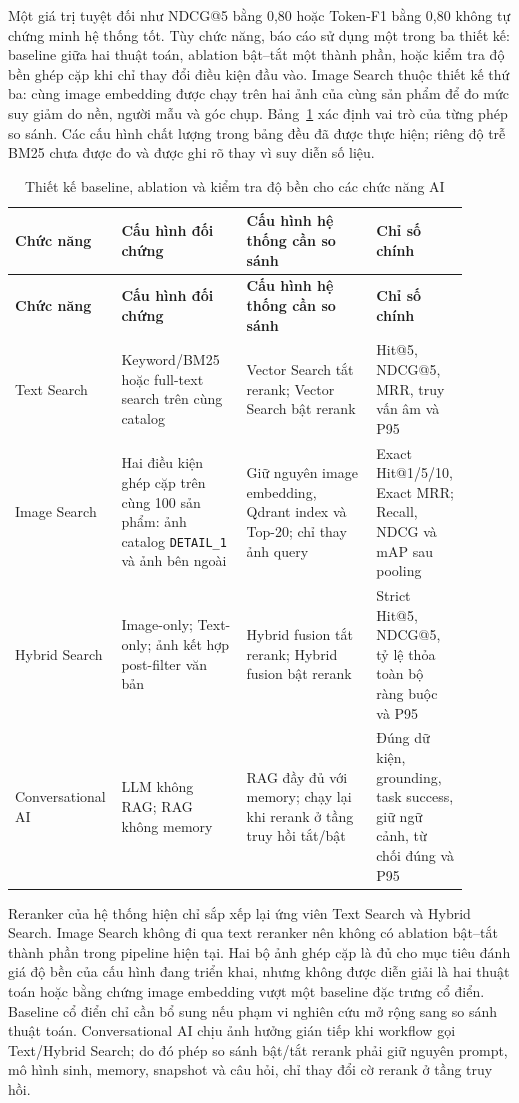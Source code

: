 Một giá trị tuyệt đối như NDCG@5 bằng 0,80 hoặc Token-F1 bằng 0,80 không tự chứng minh hệ thống tốt. Tùy chức năng, báo cáo sử dụng một trong ba thiết kế: baseline giữa hai thuật toán, ablation bật--tắt một thành phần, hoặc kiểm tra độ bền ghép cặp khi chỉ thay đổi điều kiện đầu vào. Image Search thuộc thiết kế thứ ba: cùng image embedding được chạy trên hai ảnh của cùng sản phẩm để đo mức suy giảm do nền, người mẫu và góc chụp. Bảng~\ref{tab:ai-baseline-design} xác định vai trò của từng phép so sánh. Các cấu hình chất lượng trong bảng đều đã được thực hiện; riêng độ trễ BM25 chưa được đo và được ghi rõ thay vì suy diễn số liệu.

\begin{longtable}{|p{0.17\linewidth}|p{0.27\linewidth}|p{0.29\linewidth}|p{0.17\linewidth}|}
\caption{Thiết kế baseline, ablation và kiểm tra độ bền cho các chức năng AI}\label{tab:ai-baseline-design}\\
\hline
\textbf{Chức năng} & \textbf{Cấu hình đối chứng} & \textbf{Cấu hình hệ thống cần so sánh} & \textbf{Chỉ số chính} \\ \hline
\endfirsthead
\hline
\textbf{Chức năng} & \textbf{Cấu hình đối chứng} & \textbf{Cấu hình hệ thống cần so sánh} & \textbf{Chỉ số chính} \\ \hline
\endhead
Text Search & Keyword/BM25 hoặc full-text search trên cùng catalog & Vector Search tắt rerank; Vector Search bật rerank & Hit@5, NDCG@5, MRR, truy vấn âm và P95 \\ \hline
Image Search & Hai điều kiện ghép cặp trên cùng 100 sản phẩm: ảnh catalog \texttt{DETAIL\_1} và ảnh bên ngoài & Giữ nguyên image embedding, Qdrant index và Top-20; chỉ thay ảnh query & Exact Hit@1/5/10, Exact MRR; Recall, NDCG và mAP sau pooling \\ \hline
Hybrid Search & Image-only; Text-only; ảnh kết hợp post-filter văn bản & Hybrid fusion tắt rerank; Hybrid fusion bật rerank & Strict Hit@5, NDCG@5, tỷ lệ thỏa toàn bộ ràng buộc và P95 \\ \hline
Conversational AI & LLM không RAG; RAG không memory & RAG đầy đủ với memory; chạy lại khi rerank ở tầng truy hồi tắt/bật & Đúng dữ kiện, grounding, task success, giữ ngữ cảnh, từ chối đúng và P95 \\ \hline
\end{longtable}

Reranker của hệ thống hiện chỉ sắp xếp lại ứng viên Text Search và Hybrid Search. Image Search không đi qua text reranker nên không có ablation bật--tắt thành phần trong pipeline hiện tại. Hai bộ ảnh ghép cặp là đủ cho mục tiêu đánh giá độ bền của cấu hình đang triển khai, nhưng không được diễn giải là hai thuật toán hoặc bằng chứng image embedding vượt một baseline đặc trưng cổ điển. Baseline cổ điển chỉ cần bổ sung nếu phạm vi nghiên cứu mở rộng sang so sánh thuật toán. Conversational AI chịu ảnh hưởng gián tiếp khi workflow gọi Text/Hybrid Search; do đó phép so sánh bật/tắt rerank phải giữ nguyên prompt, mô hình sinh, memory, snapshot và câu hỏi, chỉ thay đổi cờ rerank ở tầng truy hồi.

